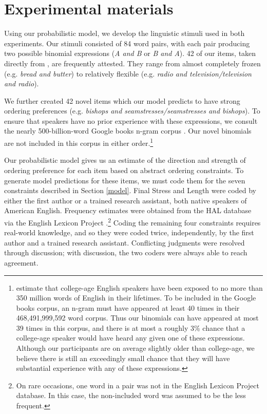 \documentclass[authoryear]{elsarticle}
\begin{document}
\section{Experimental materials}\label{materials}
Using our probabilistic model, we develop the linguistic stimuli used in both experiments. Our stimuli consisted of 84 word pairs, with each pair producing two possible binomial expressions (\emph{A and B} or \emph{B and A}). 42 of our items, taken directly from \citet{SiyanovaChanturia:2011ep}, are frequently attested. They range from almost completely frozen (e.g. \emph{bread and butter}) to relatively flexible (e.g. \emph{radio and television/television and radio}).

We further created 42 novel items which our model predicts to have strong ordering preferences (e.g. \emph{bishops and seamstresses/seamstresses and bishops}). To ensure that speakers have no prior experience with these expressions, we consult the nearly 500-billion-word Google books n-gram corpus \citep{Lin:2012te}. Our novel binomials are not included in this corpus in either order.\footnote{\citet{Levy:2012bj} estimate that college-age English speakers have been exposed to no more than 350 million words of English in their lifetimes. To be included in the Google books corpus, an n-gram must have appeared at least 40 times in their 468,491,999,592 word corpus. Thus our binomials can have appeared at most 39 times in this corpus, and there is at most a roughly 3\% chance that a college-age speaker would have heard any given one of these expressions. Although our participants are on average slightly older than college-age, we believe there is still an exceedingly small chance that they will have substantial experience with any of these expressions.} 

Our probabilistic model gives us an estimate of the direction and strength of ordering preference for each item based on abstract ordering constraints. To generate model predictions for these items, we must code them for the seven constraints described in Section \ref{model}. Final Stress and Length were coded by either the first author or a trained research assistant, both native speakers of American English. Frequency estimates were obtained from the HAL database via the English Lexicon Project \citep{Balota:2007wx}.\footnote{On rare occasions, one word in a pair was not in the English Lexicon Project database. In this case, the non-included word was assumed to be the less frequent.} Coding the remaining four constraints requires real-world knowledge, and so they were coded twice, independently, by the first author and a trained research assistant. Conflicting judgments were resolved through discussion; with discussion, the two coders were always able to reach agreement.
\end{document}
